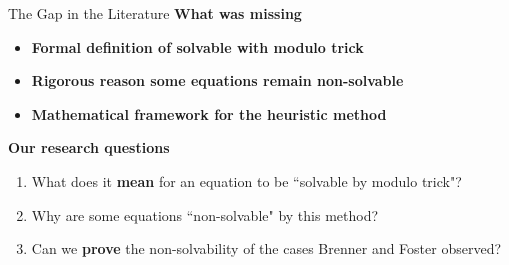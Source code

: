 \begin{frame}{The Gap in the Literature}
    \textbf{What was missing}
    \begin{itemize}
        \item \textbf{Formal definition of solvable with modulo trick}
        \item \textbf{Rigorous reason some equations remain non-solvable}
        \item \textbf{Mathematical framework for the heuristic method}
    \end{itemize}

    \vspace{0.15cm}
    \textbf{Our research questions}
    \begin{enumerate}
        \item What does it \textbf{mean} for an equation to be ``solvable by modulo trick"?
        \item Why are some equations ``non-solvable" by this method?
        \item Can we \textbf{prove} the non-solvability of the cases Brenner and Foster observed?
    \end{enumerate}
\end{frame}

